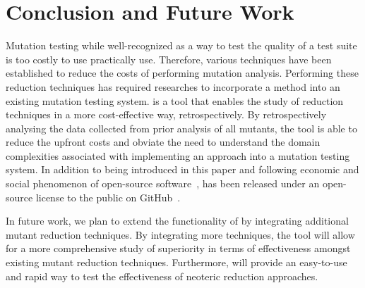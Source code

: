 \section{Conclusion and Future Work}

Mutation testing while well-recognized as a way to test the quality of a test suite is too costly
to use practically use. Therefore, various techniques have been established to reduce the costs
of performing mutation analysis. Performing these reduction techniques has required researches
to incorporate a method into an existing mutation testing system. \mr is a tool that enables
the study of reduction techniques in a more cost-effective way, retrospectively. By retrospectively
analysing the data collected from prior analysis of all mutants, the \mr tool is able to reduce
the upfront costs and obviate the need to understand the domain complexities associated with implementing an approach
into a mutation testing system. In addition to
being introduced in this paper and following economic and social phenomenon of open-source software~\cite{hippel2003open}, \mr
has been released under an open-source license to the public on GitHub~\cite{github}.

In future work, we plan to extend the functionality of \mr by integrating additional
mutant reduction techniques. By integrating more techniques, the \mr tool will allow
for a more comprehensive study of superiority in terms of effectiveness amongst existing
mutant reduction techniques. Furthermore, \mr will provide an easy-to-use and rapid
way to test the effectiveness of neoteric reduction approaches.

